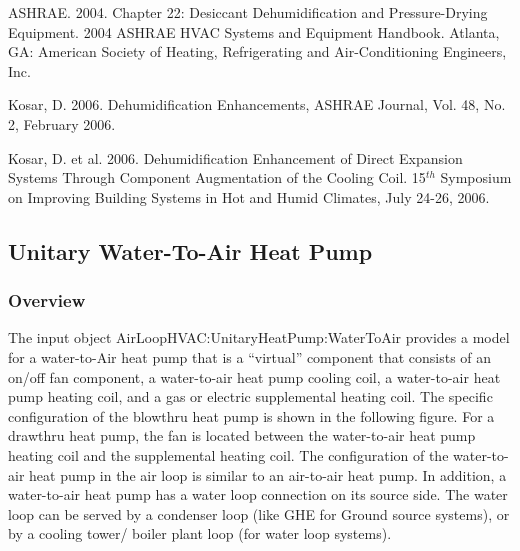 ASHRAE. 2004. Chapter 22: Desiccant Dehumidification and Pressure-Drying Equipment. 2004 ASHRAE HVAC Systems and Equipment Handbook. Atlanta, GA: American Society of Heating, Refrigerating and Air-Conditioning Engineers, Inc.

Kosar, D. 2006. Dehumidification Enhancements, ASHRAE Journal, Vol. 48, No. 2, February 2006.

Kosar, D. et al. 2006. Dehumidification Enhancement of Direct Expansion Systems Through Component Augmentation of the Cooling Coil. 15\(^{th}\) Symposium on Improving Building Systems in Hot and Humid Climates, July 24-26, 2006.

\subsection{Unitary Water-To-Air Heat Pump}\label{unitary-water-to-air-heat-pump}

\subsubsection{Overview}\label{overview-8}

The input object AirLoopHVAC:UnitaryHeatPump:WaterToAir provides a model for a water-to-Air heat pump that is a ``virtual'' component that consists of an on/off fan component, a water-to-air heat pump cooling coil, a water-to-air heat pump heating coil, and a gas or electric supplemental heating coil. The specific configuration of the blowthru heat pump is shown in the following figure. For a drawthru heat pump, the fan is located between the water-to-air heat pump heating coil and the supplemental heating coil. The configuration of the water-to-air heat pump in the air loop is similar to an air-to-air heat pump. In addition, a water-to-air heat pump has a water loop connection on its source side. The water loop can be served by a condenser loop (like GHE for Ground source systems), or by a cooling tower/ boiler plant loop (for water loop systems).


